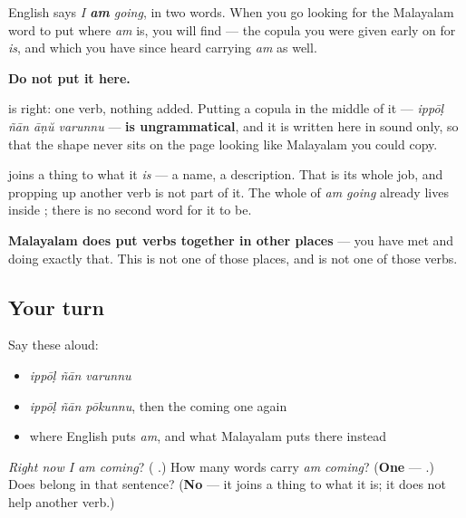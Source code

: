 \begin{grammarlens}[title={Grammar Lens: the word you must not reach for}]
English says \emph{I \textbf{am} going}, in two words. When you go looking for the Malayalam word to put where \emph{am} is, you will find \textbf{} — the copula you were given early on for \emph{is}, and which you have since heard carrying \emph{am} as well.

\textbf{Do not put it here.}

\textbf{  } is right: one verb, nothing added. Putting a copula in the middle of it — \emph{ippōḷ ñān āṇŭ varunnu} — \textbf{is ungrammatical}, and it is written here in sound only, so that the shape never sits on the page looking like Malayalam you could copy.

\textbf{} joins a thing to what it \emph{is} — a name, a description. That is its whole job, and propping up another verb is not part of it. The whole of \emph{am going} already lives inside \textbf{}; there is no second word for it to be.

\textbf{Malayalam does put verbs together in other places} — you have met \textbf{} and \textbf{} doing exactly that. This is not one of those places, and \textbf{} is not one of those verbs.
\end{grammarlens}

\subsection*{Your turn}
Say these aloud:

\begin{itemize}
\raggedright
  \item \emph{ippōḷ ñān varunnu}
  \item \emph{ippōḷ ñān pōkunnu}, then the coming one again
  \item where English puts \emph{am}, and what Malayalam puts there instead
\end{itemize}

\begin{tcolorbox}[breakable,colback=teal!4,colframe=teal!35!black,title={Before you move on}]
\emph{Right now I am coming}? (\textbf{  }.) How many words carry \emph{am coming}? (\textbf{One} — .) Does \textbf{} belong in that sentence? (\textbf{No} — it joins a thing to what it is; it does not help another verb.)
\end{tcolorbox}
